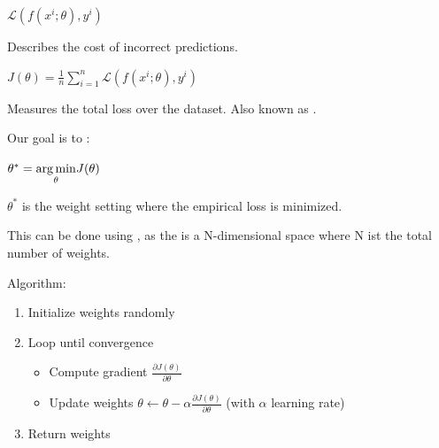 \documentclass[
../../EiKI_Summary.tex,
]
{subfiles}
\begin{document}
\begin{minipage}
    [t]{0.5\textwidth}
    \begin{defbox}
        \begin{csmb*}
            $\mathcal{L}\left(f(x^i; \theta), y^i\right)$ 
        \end{csmb*}
    
        Describes the cost of incorrect predictions.
    \end{defbox}
\end{minipage}
\begin{minipage}
    [t]{0.5\textwidth}
    \begin{defbox}
        \begin{csmb*}
            $J(\theta) = \frac{1}{n} \sum_{i=1}^{n} \mathcal{L}\left(f(x^i; \theta), y^i\right)$
        \end{csmb*}
    
        Measures the total loss over the dataset. Also known as .
    \end{defbox}
\end{minipage}

Our goal is to :

\begin{csmb*}
    $\theta^{\ast} = \underset{\theta}{\arg\min}\space\space J(\theta)$
\end{csmb*}

$\theta^{\ast}$ is the weight setting where the empirical loss is minimized.

This can be done using , as the  is a N-dimensional space where N ist the total number of weights. 

Algorithm:
\begin{enumerate}
    \item Initialize weights randomly
    \item Loop until convergence
    \begin{itemize}
        \item Compute gradient $\displaystyle \frac{\partial J(\theta)}{\partial \theta}$
        \item Update weights $\theta \leftarrow \theta - \alpha \frac{\partial J(\theta)}{\partial \theta}$ (with $\alpha$ learning rate)
    \end{itemize}
    \item Return weights
\end{enumerate}
\end{document}
